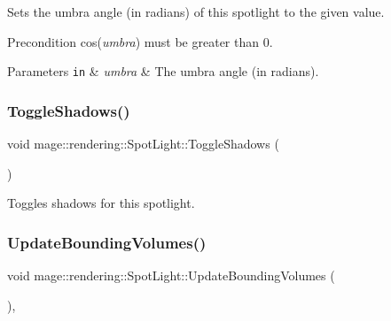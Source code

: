 Sets the umbra angle (in radians) of this spotlight to the given value.

\begin{DoxyPrecond}{Precondition}
cos({\itshape umbra}) must be greater than 0. 
\end{DoxyPrecond}

\begin{DoxyParams}[1]{Parameters}
\mbox{\tt in}  & {\em umbra} & The umbra angle (in radians). \\
\hline
\end{DoxyParams}
\hypertarget{classmage_1_1rendering_1_1_spot_light_a4e6412e05d894a97409c23d8d088cabf}{}\label{classmage_1_1rendering_1_1_spot_light_a4e6412e05d894a97409c23d8d088cabf} 
\subsubsection{\texorpdfstring{Toggle\+Shadows()}{ToggleShadows()}}
{\footnotesize\ttfamily void mage\+::rendering\+::\+Spot\+Light\+::\+Toggle\+Shadows (\begin{DoxyParamCaption}{ }\end{DoxyParamCaption})\hspace{0.3cm}{\ttfamily [noexcept]}}

Toggles shadows for this spotlight. \hypertarget{classmage_1_1rendering_1_1_spot_light_aa225a105edf22a1a430a1c3aa42bc490}{}\label{classmage_1_1rendering_1_1_spot_light_aa225a105edf22a1a430a1c3aa42bc490} 
\subsubsection{\texorpdfstring{Update\+Bounding\+Volumes()}{UpdateBoundingVolumes()}}
{\footnotesize\ttfamily void mage\+::rendering\+::\+Spot\+Light\+::\+Update\+Bounding\+Volumes (\begin{DoxyParamCaption}{ }\end{DoxyParamCaption})\hspace{0.3cm}{\ttfamily [private]}, {\ttfamily [noexcept]}}

